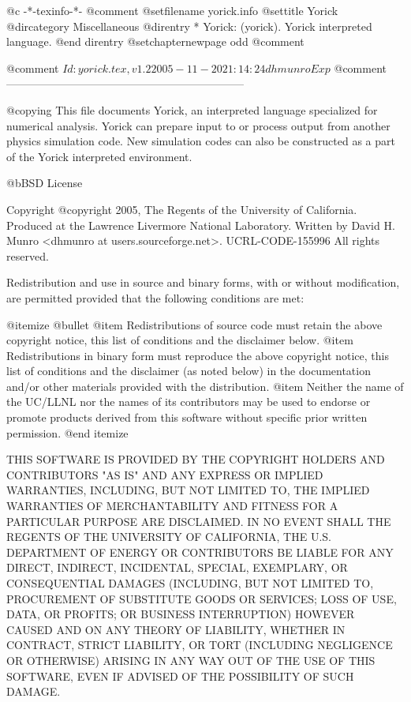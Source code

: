     @c -*-texinfo-*-
@comment %
@setfilename yorick.info
@settitle Yorick
@dircategory Miscellaneous
@direntry
* Yorick: (yorick).       Yorick interpreted language.
@end direntry
@setchapternewpage odd
@comment %

@comment $Id: yorick.tex,v 1.2 2005-11-20 21:14:24 dhmunro Exp $
@comment -----------------------------------------------------------------

@copying
This file documents Yorick, an interpreted language specialized for
numerical analysis.  Yorick can prepare input to or process output from
another physics simulation code.  New simulation codes can also be
constructed as a part of the Yorick interpreted environment.

@b{BSD License}

Copyright @copyright{} 2005, The Regents of the University of California.
Produced at the Lawrence Livermore National Laboratory.
Written by David H. Munro <dhmunro at users.sourceforge.net>.
UCRL-CODE-155996
All rights reserved.

Redistribution and use in source and binary forms, with or without
modification, are permitted provided that the following conditions are
met:

@itemize @bullet
@item
Redistributions of source code must retain the above copyright
notice, this list of conditions and the disclaimer below.
@item
Redistributions in binary form must reproduce the above copyright
notice, this list of conditions and the disclaimer (as noted below)
in the documentation and/or other materials provided with the
distribution.
@item
Neither the name of the UC/LLNL nor the names of its contributors
may be used to endorse or promote products derived from this software
without specific prior written permission.
@end itemize

THIS SOFTWARE IS PROVIDED BY THE COPYRIGHT HOLDERS AND CONTRIBUTORS
"AS IS" AND ANY EXPRESS OR IMPLIED WARRANTIES, INCLUDING, BUT NOT
LIMITED TO, THE IMPLIED WARRANTIES OF MERCHANTABILITY AND FITNESS FOR
A PARTICULAR PURPOSE ARE DISCLAIMED. IN NO EVENT SHALL THE REGENTS OF
THE UNIVERSITY OF CALIFORNIA, THE U.S. DEPARTMENT OF ENERGY OR
CONTRIBUTORS BE LIABLE FOR ANY DIRECT, INDIRECT, INCIDENTAL, SPECIAL,
EXEMPLARY, OR CONSEQUENTIAL DAMAGES (INCLUDING, BUT NOT LIMITED TO,
PROCUREMENT OF SUBSTITUTE GOODS OR SERVICES; LOSS OF USE, DATA, OR
PROFITS; OR BUSINESS INTERRUPTION) HOWEVER CAUSED AND ON ANY THEORY OF
LIABILITY, WHETHER IN CONTRACT, STRICT LIABILITY, OR TORT (INCLUDING
NEGLIGENCE OR OTHERWISE) ARISING IN ANY WAY OUT OF THE USE OF THIS
SOFTWARE, EVEN IF ADVISED OF THE POSSIBILITY OF SUCH DAMAGE.

